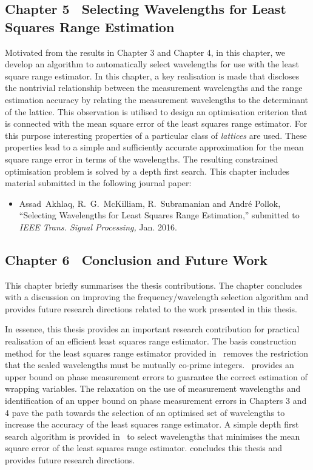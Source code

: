 \subsection*{Chapter 5 \textemdash~Selecting Wavelengths for Least Squares Range Estimation }
Motivated from the results in Chapter 3 and Chapter 4, in this chapter, we develop an algorithm to automatically select wavelengths for use with the least square range estimator. In this chapter, a key realisation is made that discloses the nontrivial relationship between the measurement wavelengths and the range estimation accuracy by relating the measurement wavelengths to the determinant of the lattice. This observation is utilised to design an optimisation criterion that is connected with the mean square error of the least squares range estimator. For this purpose interesting properties of a particular class of \emph{lattices} are used. These properties lead to a simple and sufficiently accurate approximation for the mean square range error in terms of the wavelengths. The resulting constrained optimisation problem is solved by a depth first search. \newline
This chapter includes material submitted in the following journal paper:
\newline
\begin{itemize}
\item{Assad~Akhlaq, R.~G.~McKilliam, R.~Subramanian and Andr\'e Pollok, ``{Selecting Wavelengths for Least Squares Range Estimation},'' submitted to \emph{IEEE Trans. Signal Processing,}  Jan. 2016.}
\end{itemize}

\subsection*{Chapter 6 \textemdash~Conclusion and Future Work}
This chapter briefly summarises the thesis contributions. The chapter concludes with a discussion on improving the frequency/wavelength selection algorithm and provides future research directions related to the work presented in this thesis.

In essence, this thesis provides an important research contribution for practical realisation of an efficient least squares range estimator. The basis construction method for the least squares range estimator provided in~ removes the restriction that the scaled wavelengths must be mutually co-prime integers.~ provides an upper bound on phase measurement errors to guarantee the correct estimation of wrapping variables. The relaxation on the use of measurement wavelengths and identification of an upper bound on phase measurement errors in Chapters 3 and 4 pave the path towards the selection of an optimised set of wavelengths to increase the accuracy of the least squares range estimator. A simple depth first search algorithm is provided in~ to select wavelengths that minimises the mean square error of the least squares range estimator.  concludes this thesis and provides future research directions.
